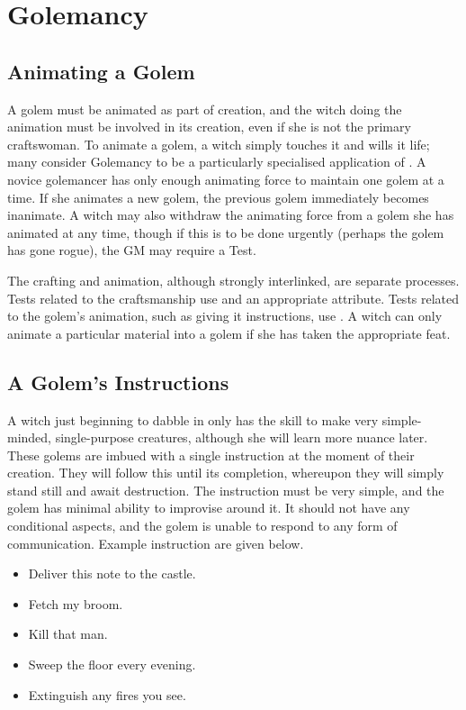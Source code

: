 \chapter{Golemancy}

\section{Animating a Golem}

A golem must be animated as part of creation, and the witch doing the animation must be involved in its creation, even if she is not the primary craftswoman.
To animate a golem, a witch simply touches it and wills it life; many consider Golemancy to be a particularly specialised application of .
A novice golemancer has only enough animating force to maintain one golem at a time.
If she animates a new golem, the previous golem immediately becomes inanimate.
A witch may also withdraw the animating force from a golem she has animated at any time, though if this is to be done urgently (perhaps the golem has gone rogue), the GM may require a Test.

The crafting and animation, although strongly interlinked, are separate processes.
Tests related to the craftsmanship use  and an appropriate attribute.
Tests related to the golem's animation, such as giving it instructions, use .
A witch can only animate a particular material into a golem if she has taken the appropriate feat.

\section{A Golem's Instructions}

A witch just beginning to dabble in  only has the skill to make very simple-minded, single-purpose creatures, although she will learn more nuance later.
These golems are imbued with a single instruction at the moment of their creation.
They will follow this until its completion, whereupon they will simply stand still and await destruction.
The instruction must be very simple, and the golem has minimal ability to improvise around it.
It should not have any conditional aspects, and the golem is unable to respond to any form of communication.
Example instruction are given below.

\begin{itemize}
	\item Deliver this note to the castle.
	\item Fetch my broom.
	\item Kill that man.
	\item Sweep the floor every evening.
	\item Extinguish any fires you see.
\end{itemize}

